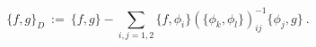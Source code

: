 \begin{equation}
\{f,g\}_{D}\ :=\ \{f,g\}-\sum_{i,j=1,2}\{f,\phi _{i}\}\left( \{\phi
_{k},\phi _{l}\}\right) _{ij}^{-1}\{\phi _{j},g\}\ .  \label{DB}
\end{equation}%
